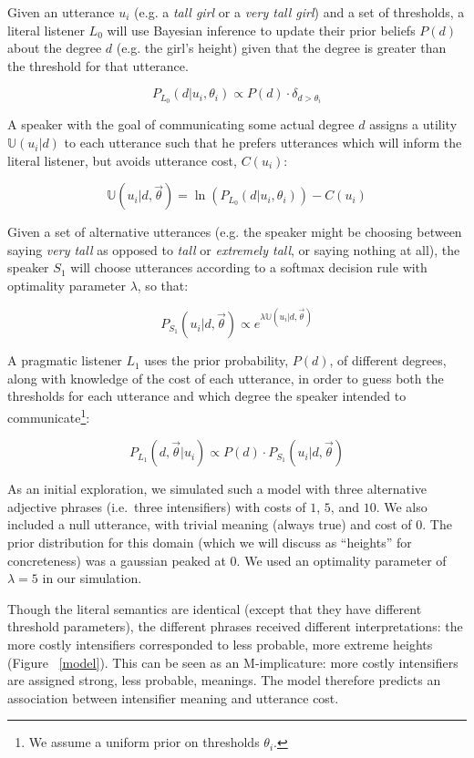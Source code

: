 \documentclass[10pt,letterpaper]{article}
\newcommand{\w}[1]{\emph{#1}}
\begin{document}
Given an utterance $u_i$ (e.g. a \w{tall girl} or a \w{very tall girl}) and a set of thresholds, a literal listener $L_0$ will use Bayesian inference to update their prior beliefs $P(d)$ about the degree $d$ (e.g. the girl's height) given that the degree is greater than the threshold for that utterance.

$$P_{L_0}(d|u_i, \theta_i) \propto P(d) \cdot \delta_{d > \theta_i}$$

A speaker with the goal of communicating some actual degree $d$ assigns a utility $\mathbb{U}(u_i|d)$ to each utterance such that he prefers utterances which will inform the literal listener, but avoids utterance cost, $C(u_i)$:

$$\mathbb{U}(u_i | d, \vec{\theta}) =  \ln\left(P_{L_0}(d | u_i, \theta_i) \right) - C(u_i) $$

Given a set of alternative utterances (e.g. the speaker might be choosing between saying \w{very tall} as opposed to \w{tall} or \w{extremely tall}, or saying nothing at all), the speaker $S_1$ will choose utterances according to a softmax decision rule \cite{sutton} with optimality parameter $\lambda$, so that:

$$ P_{S_1}(u_i | d, \vec{\theta}) \propto e^{\lambda \mathbb{U}(u_i | d, \vec{\theta})} $$

A pragmatic listener $L_1$ uses the prior probability, $P(d)$, of different degrees, along with knowledge of the cost of each utterance, in order to guess both the thresholds for each utterance and which degree the speaker intended to communicate\footnote{We assume a uniform prior on thresholds $\theta_i$.}:

$$ P_{L_1}(d, \vec{\theta} | u_i) \propto P(d) \cdot P_{S_1}(u_i | d, \vec{\theta}) $$

As an initial exploration, we simulated such a model with three alternative adjective phrases (i.e.~three intensifiers) with costs of $1$, $5$, and $10$. We also included a null utterance, with trivial meaning (always true) and cost of $0$. The prior distribution for this domain (which we will discuss as ``heights'' for concreteness) was a gaussian peaked at $0$.
We used an optimality parameter of $\lambda=5$ in our simulation. 

Though the literal semantics are identical (except that they have different threshold parameters), the different phrases received different interpretations: the more costly intensifiers corresponded to less probable, more extreme heights (Figure ~\ref{model}). This can be seen as an M-implicature: more costly intensifiers are assigned strong, less probable, meanings. 
The model therefore predicts an association between intensifier meaning and utterance cost.
\end{document}
